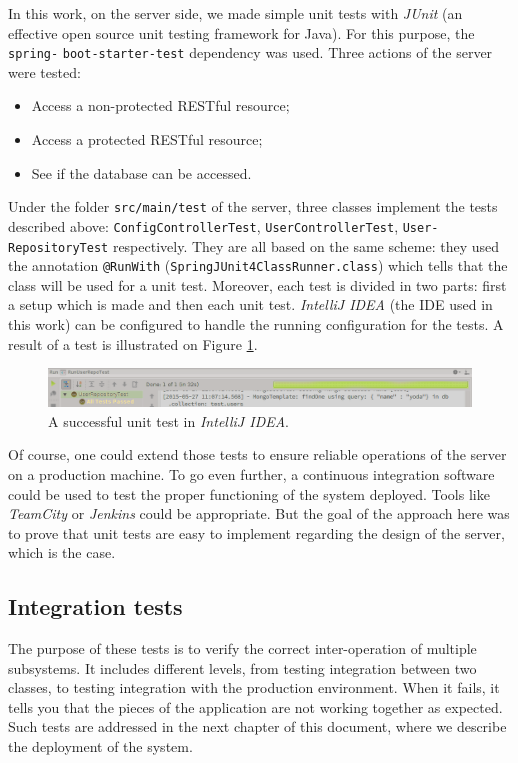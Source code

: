\documentclass[a4paper, oneside, 11pt]{book}
\begin{document}
In this work, on the server side,  we  made simple unit tests with \textit{JUnit} (an effective open source unit testing framework for Java). For this purpose, the \texttt{spring-} \verb!boot-starter-test! dependency was used. Three actions of the server were tested:
\begin{itemize}
	\item Access a non-protected RESTful resource;
	\item Access a protected RESTful resource;
	\item See if the database can be accessed.
\end{itemize}

Under the folder  \texttt{src/main/test} of the server, three classes implement the tests described above: \texttt{ConfigControllerTest}, \texttt{UserControllerTest}, \texttt{User-} \verb!RepositoryTest! respectively. They are all based on the same scheme: they used the annotation \texttt{@RunWith} (\texttt{SpringJUnit4ClassRunner.class}) which tells that the class will be used for a unit test. Moreover, each test is divided in two parts: first a setup which is made and then each unit test. \textit{IntelliJ IDEA} (the IDE used in this work) can be configured to handle the running configuration for the tests. A result of a test is illustrated on Figure \ref{fig:tests}.

\begin{figure}[htbp]
	\centerline{\includegraphics[width=1\textwidth]{tests.png}}
	\caption{A successful unit test in \textit{IntelliJ IDEA}.}
	\label{fig:tests}
\end{figure}

Of course, one could extend those tests to ensure reliable operations of the server on a production machine. To go even further, a continuous integration software could be used to test the proper functioning of the system deployed. Tools like \textit{TeamCity} or \textit{Jenkins} could be appropriate. But the goal of the approach here was to prove that unit tests are easy to implement regarding the design of the server, which is the case.

\subsection{Integration tests}
The purpose of these tests is to verify the correct inter-operation of multiple subsystems. It includes different levels, from testing integration between two classes, to testing integration with the production environment. When it fails, it tells you that the pieces of the application are not working together as expected. Such tests are addressed in the next chapter of this document, where we describe the deployment of the system.
\end{document}
